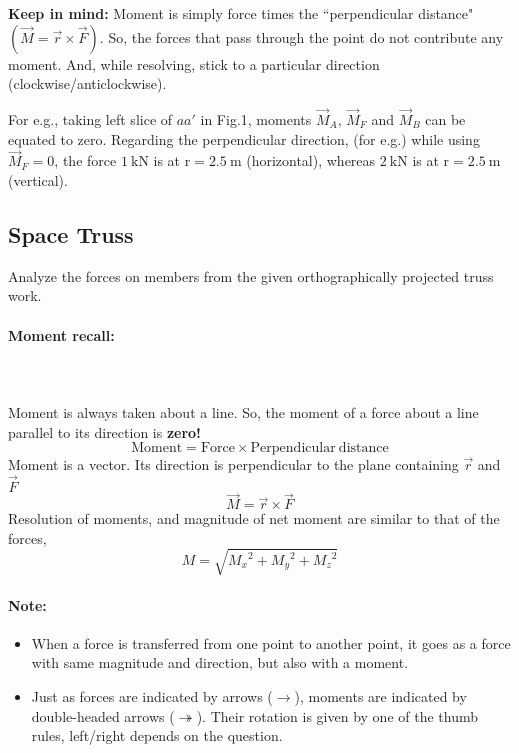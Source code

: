 \documentclass{article}
\newcommand{\para}[1]{\paragraph{#1}\mbox{}\\}
\begin{document}
{\begin{enumerate}[(a)]
\textbf{\Large Keep in mind:} Moment is simply force times the ``perpendicular distance" $(\vec M=\vec r\times \vec F)$. So, the forces that pass through the point do not contribute any moment. And, while resolving, stick to a particular direction (clockwise/anticlockwise).
\newline

For e.g., taking left slice of $aa'$ in Fig.1, moments $\vec M_A$, $\vec M_F$ and $\vec M_B$ can be equated to zero. Regarding the perpendicular direction, (for e.g.) while using $\vec M_F=0$, the force $\mathrm{1\ kN}$ is at $\mathrm{r=2.5\ m}$ (horizontal), whereas $\mathrm{2\ kN}$ is at $\mathrm{r=2.5\ m}$ (vertical).
\end{enumerate}
\newpage
\subsection{\LARGE Space Truss}
Analyze the forces on members from the given orthographically projected truss work.
\para{\Large Moment recall:}
\\
Moment is always taken about a line. So, the moment of a force about a line parallel to its direction is \textbf{zero!}
$$\mathrm{Moment=Force\times Perpendicular\ distance}$$
Moment is a vector. Its direction is perpendicular to the plane containing $\vec r$ and $\vec F$
{\LARGE $$\vec M=\vec r \times \vec F$$}
Resolution of moments, and magnitude of net moment are similar to that of the forces,
{\LARGE $$M=\sqrt{{M_x}^2+{M_y}^2+{M_z}^2}$$}
\paragraph{\Large Note:}
\begin{itemize}
\item When a force is transferred from one point to another point, it goes as a force with same magnitude and direction, but also with a moment.
\item Just as forces are indicated by arrows ($\rightarrow $), moments are indicated by double-headed arrows ({\huge $\twoheadrightarrow $}). Their rotation is given by one of the thumb rules, left/right depends on the question.
\end{itemize}
\newpage
}
\end{document}

